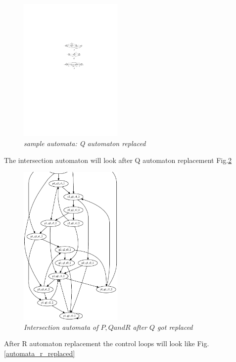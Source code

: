 \begin{figure}
\begin{center}
\includegraphics[width=50mm]{graph_after_q_replacement.pdf}
\end{center}
\caption{{\em  sample automata: Q automaton replaced}}
\label{automata_q_replaced}
\end{figure}



The intersection automaton will look after Q automaton replacement Fig.\ref{graph_q_replaced}

 \begin{figure}
\begin{center}
\includegraphics[width=50mm]{graph_q_replaced.pdf}
\end{center}
\caption{{\em Intersection automata of $P, Q and R$ after $Q$ got replaced}}
\label{graph_q_replaced}
\end{figure}


After R automaton replacement the control loops will look like Fig. \ref{automata_r_replaced}

